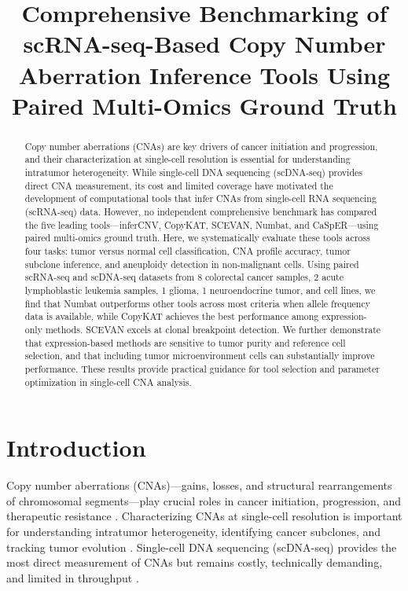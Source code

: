 \documentclass[11pt]{article}
\title{Comprehensive Benchmarking of scRNA-seq-Based Copy Number Aberration Inference Tools Using Paired Multi-Omics Ground Truth}
\author{%
}
\date{}
\begin{document}
\maketitle

\begin{abstract}
Copy number aberrations (CNAs) are key drivers of cancer initiation and progression, and their characterization at single-cell resolution is essential for understanding intratumor heterogeneity. While single-cell DNA sequencing (scDNA-seq) provides direct CNA measurement, its cost and limited coverage have motivated the development of computational tools that infer CNAs from single-cell RNA sequencing (scRNA-seq) data. However, no independent comprehensive benchmark has compared the five leading tools---inferCNV, CopyKAT, SCEVAN, Numbat, and CaSpER---using paired multi-omics ground truth. Here, we systematically evaluate these tools across four tasks: tumor versus normal cell classification, CNA profile accuracy, tumor subclone inference, and aneuploidy detection in non-malignant cells. Using paired scRNA-seq and scDNA-seq datasets from 8 colorectal cancer samples, 2 acute lymphoblastic leukemia samples, 1 glioma, 1 neuroendocrine tumor, and cell lines, we find that Numbat outperforms other tools across most criteria when allele frequency data is available, while CopyKAT achieves the best performance among expression-only methods. SCEVAN excels at clonal breakpoint detection. We further demonstrate that expression-based methods are sensitive to tumor purity and reference cell selection, and that including tumor microenvironment cells can substantially improve performance. These results provide practical guidance for tool selection and parameter optimization in single-cell CNA analysis.
\end{abstract}

\section{Introduction}

Copy number aberrations (CNAs)---gains, losses, and structural rearrangements of chromosomal segments---play crucial roles in cancer initiation, progression, and therapeutic resistance \citep{Beroukhim2010,Zack2013}. Characterizing CNAs at single-cell resolution is important for understanding intratumor heterogeneity, identifying cancer subclones, and tracking tumor evolution \citep{Navin2011,Gao2016}. Single-cell DNA sequencing (scDNA-seq) provides the most direct measurement of CNAs but remains costly, technically demanding, and limited in throughput \citep{Zahn2017,Laks2019}.
\end{document}
